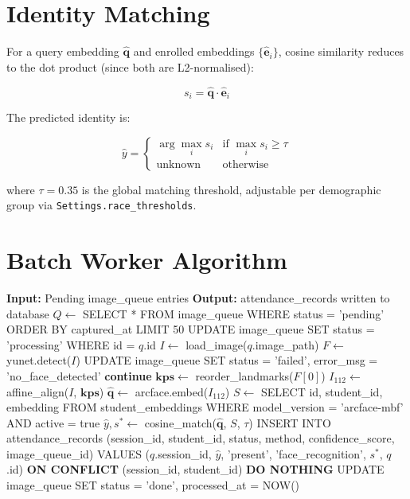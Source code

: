 \documentclass[12pt,a4paper]{report}
\begin{document}
\section{Identity Matching}
For a query embedding $\hat{\mathbf{q}}$ and enrolled embeddings $\{\hat{\mathbf{e}}_i\}$, cosine similarity reduces to the dot product (since both are L2-normalised):

\begin{equation}
  s_i = \hat{\mathbf{q}} \cdot \hat{\mathbf{e}}_i
\end{equation}

The predicted identity is:

\begin{equation}
  \hat{y} = \begin{cases}
    \arg\max_i s_i & \text{if } \max_i s_i \geq \tau \\
    \text{unknown} & \text{otherwise}
  \end{cases}
\end{equation}

where $\tau = 0.35$ is the global matching threshold, adjustable per demographic group via \texttt{Settings.race\_thresholds}.

\section{Batch Worker Algorithm}
\label{sec:prototype}

\begin{algorithm}[H]
\caption{Batch Attendance Processing}
\label{alg:calibration}
\begin{algorithmic}[1]
\State \textbf{Input:} Pending image\_queue entries
\State \textbf{Output:} attendance\_records written to database
\State $Q \leftarrow$ SELECT * FROM image\_queue WHERE status = 'pending' ORDER BY captured\_at LIMIT 50
  \State UPDATE image\_queue SET status = 'processing' WHERE id = $q$.id
  \State $I \leftarrow$ load\_image($q$.image\_path)
  \State $F \leftarrow$ yunet.detect($I$)
    \State UPDATE image\_queue SET status = 'failed', error\_msg = 'no\_face\_detected'
    \State \textbf{continue}
  \EndIf
  \State $\mathbf{kps} \leftarrow$ reorder\_landmarks($F[0]$)
  \State $I_{112} \leftarrow$ affine\_align($I$, $\mathbf{kps}$)
  \State $\hat{\mathbf{q}} \leftarrow$ arcface.embed($I_{112}$)
  \State $S \leftarrow$ SELECT id, student\_id, embedding FROM student\_embeddings WHERE model\_version = 'arcface-mbf' AND active = true
  \State $\hat{y}, s^* \leftarrow$ cosine\_match($\hat{\mathbf{q}}$, $S$, $\tau$)
    \State INSERT INTO attendance\_records (session\_id, student\_id, status, method, confidence\_score, image\_queue\_id)
    \State VALUES ($q$.session\_id, $\hat{y}$, 'present', 'face\_recognition', $s^*$, $q$.id)
    \State \textbf{ON CONFLICT} (session\_id, student\_id) \textbf{DO NOTHING}
  \EndIf
  \State UPDATE image\_queue SET status = 'done', processed\_at = NOW()
\EndFor
\end{algorithmic}
\end{algorithm}
\end{document}

